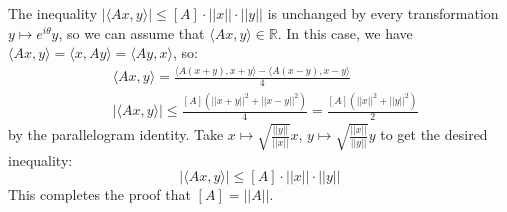 \documentclass[11pt,a4paper]{article}
\newcommand{\R}{\mathbb{R}}
\newcommand{\1}{\mathbbm{1}}
\begin{document}
The inequality $|\langle Ax , y \rangle| \leq [A] \cdot ||x|| \cdot ||y||$ is unchanged by every transformation $y \mapsto e^{i\theta} y$, so we can assume that $\langle Ax , y \rangle \in \R$. In this case, we have $\langle Ax , y \rangle = \langle x , Ay \rangle = \langle Ay , x \rangle$, so:
\begin{align*} & \langle Ax , y \rangle = \frac{\langle A(x+y) , x+y \rangle - \langle A(x-y) , x-y \rangle}{4} \\
& |\langle Ax , y \rangle| \leq \frac{[A]\left(||x+y||^2 + ||x-y||^2 \right)}{4} = \frac{[A]\left(||x||^2 + ||y||^2 \right)}{2}
\end{align*}
by the parallelogram identity. Take $x \mapsto \sqrt{\frac{||y||}{||x||}} x$, $y \mapsto \sqrt{\frac{||x||}{||y||}} y$ to get the  desired inequality:
\[ |\langle Ax , y \rangle| \leq [A] \cdot ||x|| \cdot ||y|| \]
This completes the proof that $[A] = ||A||$.
\end{document}
